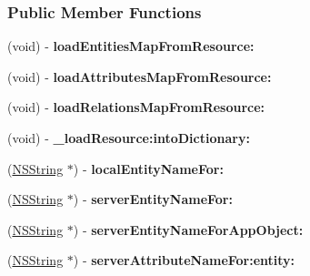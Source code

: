\subsubsection*{Public Member Functions}
\begin{DoxyCompactItemize}
\item 
\hypertarget{interface_a_t_mapping_helper_a73fc4c531c66209f448ed0d79835fe56}{
(void) -\/ {\bfseries loadEntitiesMapFromResource:}}
\label{interface_a_t_mapping_helper_a73fc4c531c66209f448ed0d79835fe56}

\item 
\hypertarget{interface_a_t_mapping_helper_a9ec9ef5dc665692dce4fca0e6d050a0e}{
(void) -\/ {\bfseries loadAttributesMapFromResource:}}
\label{interface_a_t_mapping_helper_a9ec9ef5dc665692dce4fca0e6d050a0e}

\item 
\hypertarget{interface_a_t_mapping_helper_a9c616f062a025869711abbfe94796581}{
(void) -\/ {\bfseries loadRelationsMapFromResource:}}
\label{interface_a_t_mapping_helper_a9c616f062a025869711abbfe94796581}

\item 
\hypertarget{interface_a_t_mapping_helper_a0ab20c0f77c385dac21377dee445a3f6}{
(void) -\/ {\bfseries \_\-loadResource:intoDictionary:}}
\label{interface_a_t_mapping_helper_a0ab20c0f77c385dac21377dee445a3f6}

\item 
\hypertarget{interface_a_t_mapping_helper_a9fa5dd9036bd1e47208ca98a11003b2f}{
(\hyperlink{class_n_s_string}{NSString} $\ast$) -\/ {\bfseries localEntityNameFor:}}
\label{interface_a_t_mapping_helper_a9fa5dd9036bd1e47208ca98a11003b2f}

\item 
\hypertarget{interface_a_t_mapping_helper_aea4cc83c108b4dce637d7188b2015e5d}{
(\hyperlink{class_n_s_string}{NSString} $\ast$) -\/ {\bfseries serverEntityNameFor:}}
\label{interface_a_t_mapping_helper_aea4cc83c108b4dce637d7188b2015e5d}

\item 
\hypertarget{interface_a_t_mapping_helper_a339e9e1ee190e95be0c00cc86dc3794c}{
(\hyperlink{class_n_s_string}{NSString} $\ast$) -\/ {\bfseries serverEntityNameForAppObject:}}
\label{interface_a_t_mapping_helper_a339e9e1ee190e95be0c00cc86dc3794c}

\item 
\hypertarget{interface_a_t_mapping_helper_a045ecbcd62366a3de84fccc190bc7697}{
(\hyperlink{class_n_s_string}{NSString} $\ast$) -\/ {\bfseries serverAttributeNameFor:entity:}}
\label{interface_a_t_mapping_helper_a045ecbcd62366a3de84fccc190bc7697}


\end{DoxyCompactItemize}
